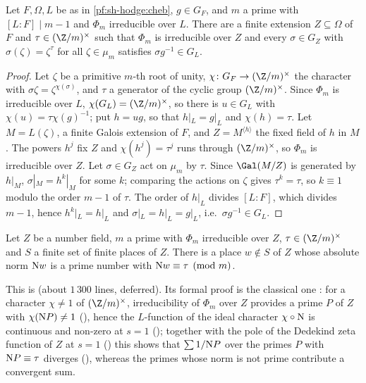 \begin{lemma}\label{pf:sh-hodge:cross}
Let $F,\Omega,L$ be as in \cref{pf:sh-hodge:cheb}, $g\in G_F$, and $m$ a prime with $[L:F]\mid m-1$ and $\Phi_m$ irreducible over
$L$. There are a finite extension $Z\subseteq\Omega$ of $F$ and $\tau\in(\Z/m)^\times$ such that $\Phi_m$ is irreducible over
$Z$ and every $\sigma\in G_Z$ with $\sigma(\zeta)=\zeta^\tau$ for all $\zeta\in\mu_m$ satisfies $\sigma g^{-1}\in G_L$.
\end{lemma}

\begin{proof}
Let $\zeta$ be a primitive $m$-th root of unity, $\chi\colon G_F\to(\Z/m)^\times$ the character with $\sigma\zeta=\zeta^{\chi(\sigma)}$,
and $\tau$ a generator of the cyclic group $(\Z/m)^\times$. Since $\Phi_m$ is irreducible over $L$, $\chi(G_L)=(\Z/m)^\times$, so
there is $u\in G_L$ with $\chi(u)=\tau\chi(g)^{-1}$; put $h=ug$, so that $h|_L=g|_L$ and $\chi(h)=\tau$. Let $M=L(\zeta)$, a finite
Galois extension of $F$, and $Z=M^{\langle h\rangle}$ the fixed field of $h$ in $M$. The powers $h^j$ fix $Z$ and $\chi(h^j)=\tau^j$
runs through $(\Z/m)^\times$, so $\Phi_m$ is irreducible over $Z$. Let $\sigma\in G_Z$ act on $\mu_m$ by $\tau$. Since
$\Gal(M/Z)$ is generated by $h|_M$, $\sigma|_M=h^k|_M$ for some $k$; comparing the actions on $\zeta$ gives $\tau^k=\tau$, so
$k\equiv1$ modulo the order $m-1$ of $\tau$. The order of $h|_L$ divides $[L:F]$, which divides $m-1$, hence $h^k|_L=h|_L$ and
$\sigma|_L=h|_L=g|_L$, i.e.\ $\sigma g^{-1}\in G_L$.
\end{proof}

\begin{lemma}\label{pf:sh-hodge:dirichlet}
Let $Z$ be a number field, $m$ a prime with $\Phi_m$ irreducible over $Z$, $\tau\in(\Z/m)^\times$ and $S$ a finite set of finite
places of $Z$. There is a place $w\notin S$ of $Z$ whose absolute norm $\mathrm{N} w$ is a prime number with $\mathrm{N} w\equiv\tau
\pmod m$.
\end{lemma}

This is  (about $1\,300$ lines, deferred). Its
formal proof is the classical one \cite{Hecke1920}: for a character $\chi\ne1$ of $(\Z/m)^\times$, irreducibility of $\Phi_m$
over $Z$ provides a prime $P$ of $Z$ with $\chi(\mathrm{N} P)\ne1$
(), hence the $L$-function of the ideal character
$\chi\circ\mathrm{N}$ is continuous and non-zero at $s=1$
(); together with the pole of the Dedekind zeta function
of $Z$ at $s=1$ () this shows that $\sum1/\mathrm{N} P$
over the primes $P$ with $\mathrm{N} P\equiv\tau$ diverges (), whereas the
primes whose norm is not prime contribute a convergent sum.

